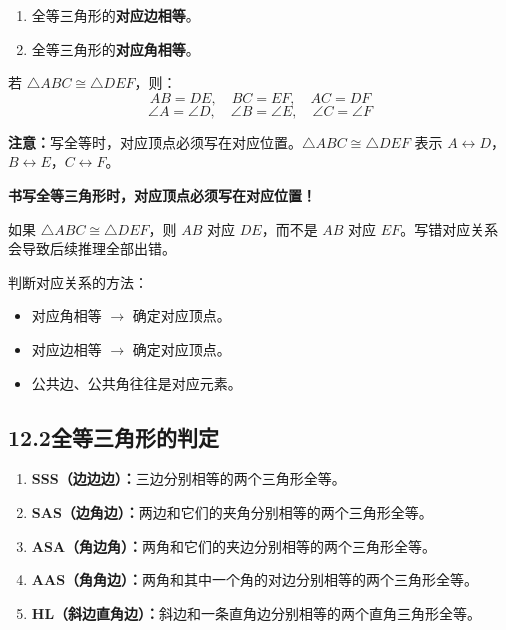 \documentclass[12pt, a4paper]{ctexart}
\begin{document}
\begin{knowledgebox}[全等三角形的性质]
\begin{enumerate}[nosep]
  \item 全等三角形的\textbf{对应边相等}。
  \item 全等三角形的\textbf{对应角相等}。
\end{enumerate}

若 $\triangle ABC \cong \triangle DEF$，则：
\[
AB = DE, \quad BC = EF, \quad AC = DF
\]
\[
\angle A = \angle D, \quad \angle B = \angle E, \quad \angle C = \angle F
\]

\textbf{注意：}写全等时，对应顶点必须写在对应位置。$\triangle ABC \cong \triangle DEF$ 表示 $A \leftrightarrow D$，$B \leftrightarrow E$，$C \leftrightarrow F$。
\end{knowledgebox}

\begin{warnbox}[易错提醒]
\textbf{书写全等三角形时，对应顶点必须写在对应位置！}

如果 $\triangle ABC \cong \triangle DEF$，则 $AB$ 对应 $DE$，而不是 $AB$ 对应 $EF$。写错对应关系会导致后续推理全部出错。

判断对应关系的方法：
\begin{itemize}[nosep]
  \item 对应角相等 $\rightarrow$ 确定对应顶点。
  \item 对应边相等 $\rightarrow$ 确定对应顶点。
  \item 公共边、公共角往往是对应元素。
\end{itemize}
\end{warnbox}

\subsection*{12.2\quad 全等三角形的判定}

\begin{knowledgebox}[全等三角形的判定方法]
\begin{enumerate}[nosep]
  \item \textbf{SSS（边边边）：}三边分别相等的两个三角形全等。
  \item \textbf{SAS（边角边）：}两边和它们的夹角分别相等的两个三角形全等。
  \item \textbf{ASA（角边角）：}两角和它们的夹边分别相等的两个三角形全等。
  \item \textbf{AAS（角角边）：}两角和其中一个角的对边分别相等的两个三角形全等。
  \item \textbf{HL（斜边直角边）：}斜边和一条直角边分别相等的两个直角三角形全等。
\end{enumerate}
\end{knowledgebox}
\end{document}
